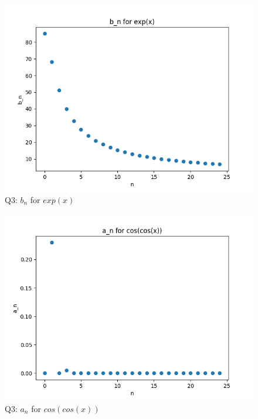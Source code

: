 \documentclass[11pt, a4paper]{article}
\begin{document}
   \begin{figure}[!tbh]
   	\centering
  \includegraphics[scale=0.5]{bn-exp.png} 
    \caption{Q3: $b_{n}$ for $exp(x)$}
   	\label{fig:bn for exp()}
   \end{figure}
   
   \begin{figure}[!tbh]
   	\centering
  \includegraphics[scale=0.5]{an-cos.png} 
    \caption{Q3: $a_{n}$ for $cos(cos(x))$}
   	\label{fig:an for coscos()}
   \end{figure}
	
\end{document}
